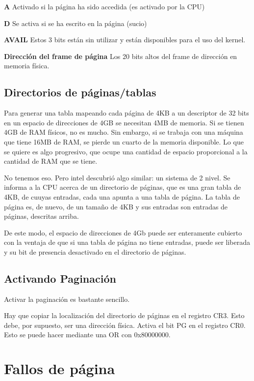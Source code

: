 \documentclass{report}
\begin{document}
\textbf{A}
    Activado si la página ha sido accedida (es activado por la CPU)

\textbf{D}
    Se activa si se ha escrito en la página (sucio)

\textbf{AVAIL}
    Estos 3 bits están sin utilizar y están disponibles para el uso del kernel.

\textbf{Dirección del frame de página}
    Los 20 bits altos del frame de dirección en memoria física.
    
\subsection{Directorios de páginas/tablas}


Para generar una tabla mapeando cada página de 4KB a un descriptor de 32 bits en un espacio de direcciones de 4GB se necesitan 4MB de memoria. Si se tienen 4GB de RAM físicos, no es mucho. Sin embargo, si se trabaja con una máquina que tiene 16MB de RAM, se pierde un cuarto de la memoria disponible. Lo que se quiere es algo progresivo, que ocupe una cantidad de espacio proporcional a la cantidad de RAM que se tiene.

No tenemos eso. Pero intel descubrió algo similar: un sistema de 2 nivel. Se informa a la CPU acerca de un directorio de páginas, que es una gran tabla de 4KB, de cuuyas entradas, cada una apunta a una tabla de página. La tabla de página es, de nuevo, de un tamaño de 4KB y sus entradas son entradas de páginas, descritas arriba.

De este modo, el espacio de direcciones de 4Gb puede ser enteramente cubierto con la ventaja de que si una tabla de página no tiene entradas, puede ser liberada y su bit de presencia desactivado en el directorio de páginas.

\subsection{Activando Paginación}

Activar la paginación es bastante sencillo.

Hay que copiar la localización del directorio de páginas en el registro CR3. Esto debe, por supuesto, ser una dirección física.
Activa el bit PG en el registro CR0. Esto se puede hacer mediante una OR con 0x80000000.


\section{Fallos de página}
\end{document}
